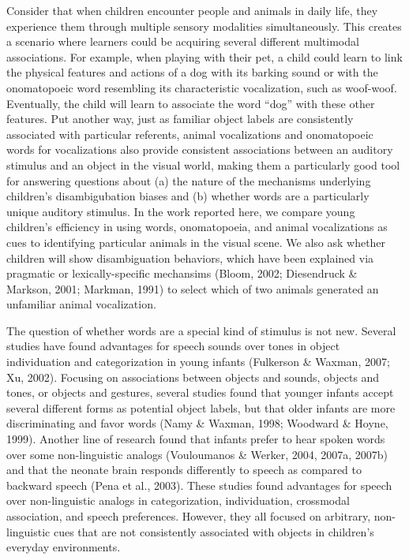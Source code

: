 \documentclass[english,floatsintext,man]{apa6}
\theoremstyle{definition}
\theoremstyle{definition}
\theoremstyle{definition}
\theoremstyle{remark}
\begin{document}
Consider that when children encounter people and animals in daily life,
they experience them through multiple sensory modalities simultaneously.
This creates a scenario where learners could be acquiring several
different multimodal associations. For example, when playing with their
pet, a child could learn to link the physical features and actions of a
dog with its barking sound or with the onomatopoeic word resembling its
characteristic vocalization, such as woof-woof. Eventually, the child
will learn to associate the word \enquote{dog} with these other
features. Put another way, just as familiar object labels are
consistently associated with particular referents, animal vocalizations
and onomatopoeic words for vocalizations also provide consistent
associations between an auditory stimulus and an object in the visual
world, making them a particularly good tool for answering questions
about (a) the nature of the mechanisms underlying children's
disambigubation biases and (b) whether words are a particularly unique
auditory stimulus. In the work reported here, we compare young
children's efficiency in using words, onomatopoeia, and animal
vocalizations as cues to identifying particular animals in the visual
scene. We also ask whether children will show disambiguation behaviors,
which have been explained via pragmatic or lexically-specific mechansims
(Bloom, 2002; Diesendruck \& Markson, 2001; Markman, 1991) to select
which of two animals generated an unfamiliar animal vocalization.

The question of whether words are a special kind of stimulus is not new.
Several studies have found advantages for speech sounds over tones in
object individuation and categorization in young infants (Fulkerson \&
Waxman, 2007; Xu, 2002). Focusing on associations between objects and
sounds, objects and tones, or objects and gestures, several studies
found that younger infants accept several different forms as potential
object labels, but that older infants are more discriminating and favor
words (Namy \& Waxman, 1998; Woodward \& Hoyne, 1999). Another line of
research found that infants prefer to hear spoken words over some
non-linguistic analogs (Vouloumanos \& Werker, 2004, 2007a, 2007b) and
that the neonate brain responds differently to speech as compared to
backward speech (Pena et al., 2003). These studies found advantages for
speech over non-linguistic analogs in categorization, individuation,
crossmodal association, and speech preferences. However, they all
focused on arbitrary, non-linguistic cues that are not consistently
associated with objects in children's everyday environments.
\end{document}
